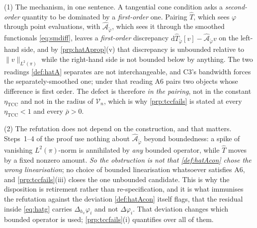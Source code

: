 \begin{remark}\label{rem:tccwhy}
(1) The mechanism, in one sentence. A tangential cone condition asks a \emph{second-order}
quantity to be dominated by a \emph{first-order} one. Pairing $\hat T$, which sees $\varphi$ through
point evaluations, with $\hat{\mathcal A}_{\tilde\varphi}$, which sees it through the smoothed
functionals \eqref{eq:smdiff}, leaves a \emph{first-order} discrepancy
$\mathrm d\hat T_{\tilde\varphi}[v]-\hat{\mathcal A}_{\tilde\varphi}v$ on the left-hand side, and
by \cref{prp:hatAprop}(v) that discrepancy is unbounded relative to $\|v\|_{L^{2}(\pi)}$ while the
right-hand side is not bounded below by anything. The two readings \cref{def:hatA} separates are
not interchangeable, and C3's bandwidth forces the separately-smoothed one; under that reading A6 pairs
two objects whose difference is first order. The defect is therefore \emph{in the pairing}, not in the
constant $\eta_{\mathrm{TCC}}$ and not in the radius of $\mathcal V_n$, which is why
\cref{prp:tccfails} is stated at every $\eta_{\mathrm{TCC}}<1$ and every $\bar\rho>0$.

(2) The refutation does not depend on the construction, and that matters. Steps~1--4 of the
proof use nothing about $\hat{\mathcal A}_{\tilde\varphi}$ beyond boundedness: a spike of vanishing
$L^{2}(\pi)$-norm is annihilated by \emph{any} bounded operator, while $\hat T$ moves by a fixed
nonzero amount. \emph{So the obstruction is not that \cref{def:hatAcon} chose the wrong linearisation};
no choice of bounded linearisation whatsoever satisfies A6, and \cref{prp:tccfails}(iii) closes the one
unbounded candidate. This is why the disposition is retirement rather than re-specification, and it is
what immunises the refutation against the deviation \cref{def:hatAcon} itself flags, that the
residual inside \eqref{eq:hatg} carries $\Delta_{h_x}\varphi_i$ and not $\Delta\varphi_i$. That
deviation changes which bounded operator is used; \cref{prp:tccfails}(i) quantifies over all of them.


\end{remark}
